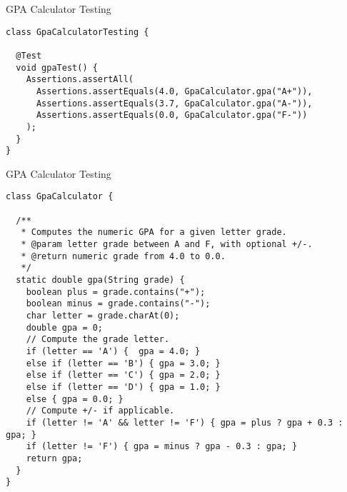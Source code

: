 
\begin{cl}[]{GPA Calculator Testing}
\begin{lstlisting}[language=MyJava]
class GpaCalculatorTesting {

  @Test
  void gpaTest() {
    Assertions.assertAll(
      Assertions.assertEquals(4.0, GpaCalculator.gpa("A+")),
      Assertions.assertEquals(3.7, GpaCalculator.gpa("A-")),
      Assertions.assertEquals(0.0, GpaCalculator.gpa("F-"))
    );
  }
}
\end{lstlisting}
\end{cl}

\begin{cl}[]{GPA Calculator Testing}
\begin{lstlisting}[language=MyJava]
class GpaCalculator {

  /**
   * Computes the numeric GPA for a given letter grade.
   * @param letter grade between A and F, with optional +/-.
   * @return numeric grade from 4.0 to 0.0.
   */
  static double gpa(String grade) {
    boolean plus = grade.contains("+");
    boolean minus = grade.contains("-");
    char letter = grade.charAt(0);
    double gpa = 0;
    // Compute the grade letter.
    if (letter == 'A') {  gpa = 4.0; } 
    else if (letter == 'B') { gpa = 3.0; } 
    else if (letter == 'C') { gpa = 2.0; } 
    else if (letter == 'D') { gpa = 1.0; } 
    else { gpa = 0.0; }
    // Compute +/- if applicable.
    if (letter != 'A' && letter != 'F') { gpa = plus ? gpa + 0.3 : gpa; }
    if (letter != 'F') { gpa = minus ? gpa - 0.3 : gpa; }
    return gpa;
  }
}
\end{lstlisting}
\end{cl}

